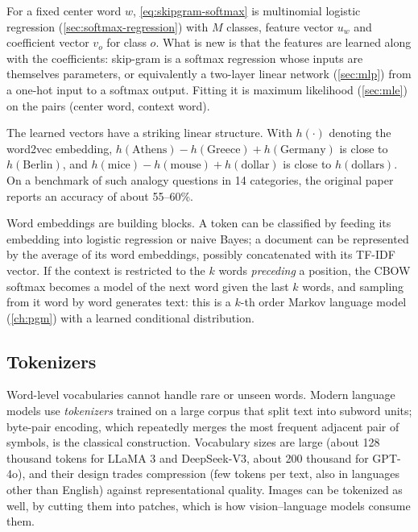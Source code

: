 \begin{remark}
For a fixed center word $w$, \eqref{eq:skipgram-softmax} is multinomial logistic regression (\cref{sec:softmax-regression}) with $M$ classes, feature vector $u_w$ and coefficient vector $v_o$ for class $o$. What is new is that the features are learned along with the coefficients: skip-gram is a softmax regression whose inputs are themselves parameters, or equivalently a two-layer linear network (\cref{sec:mlp}) from a one-hot input to a softmax output. Fitting it is maximum likelihood (\cref{sec:mle}) on the pairs (center word, context word).
\end{remark}

The learned vectors have a striking linear structure. With $h(\cdot)$ denoting the word2vec embedding, $h(\text{Athens})-h(\text{Greece})+h(\text{Germany})$ is close to $h(\text{Berlin})$, and $h(\text{mice})-h(\text{mouse})+h(\text{dollar})$ is close to $h(\text{dollars})$. On a benchmark of such analogy questions in 14 categories, the original paper reports an accuracy of about 55--60\%.

Word embeddings are building blocks. A token can be classified by feeding its embedding into logistic regression or naive Bayes; a document can be represented by the average of its word embeddings, possibly concatenated with its TF-IDF vector. If the context is restricted to the $k$ words \emph{preceding} a position, the CBOW softmax becomes a model of the next word given the last $k$ words, and sampling from it word by word generates text: this is a $k$-th order Markov language model (\cref{ch:pgm}) with a learned conditional distribution.

\subsection{Tokenizers}

Word-level vocabularies cannot handle rare or unseen words. Modern language models use \emph{tokenizers} trained on a large corpus that split text into subword units; byte-pair encoding, which repeatedly merges the most frequent adjacent pair of symbols, is the classical construction. Vocabulary sizes are large (about 128 thousand tokens for LLaMA 3 and DeepSeek-V3, about 200 thousand for GPT-4o), and their design trades compression (few tokens per text, also in languages other than English) against representational quality. Images can be tokenized as well, by cutting them into patches, which is how vision--language models consume them.

